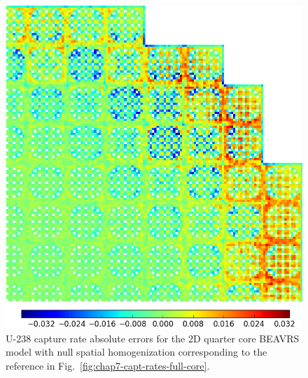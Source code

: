 \begin{appendices}
\begin{figure}[h!]
\centering
\includegraphics[width=\linewidth]{figures/patterns/appendix/full-core/capt-err-null-magnitude}
\vspace{2mm}
\caption[U-238 capture rate absolute errors for BEAVRS]{U-238 capture rate absolute errors for the 2D quarter core \ac{BEAVRS} model with null spatial homogenization corresponding to the reference in Fig.~\ref{fig:chap7-capt-rates-full-core}.}
\label{fig:null-full-core-capt-err-abs}
\end{figure}

\clearpage


\end{appendices}
